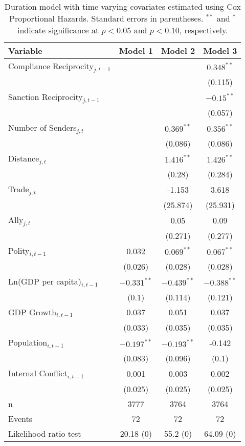 \begin{table}[ht]
\centering
{\normalsize
\begin{tabular}{lccc}
 Variable & Model 1 & Model 2 & Model 3 \\ 
  \hline
\hline
Compliance Reciprocity$_{j,t-1}$ &  &  & $0.348^{\ast\ast}$ \\ 
   &  &  & (0.115) \\ 
  Sanction Reciprocity$_{j,t-1}$ &  &  & $-0.15^{\ast\ast}$ \\ 
   &  &  & (0.057) \\ 
   \hline
Number of Senders$_{j,t}$ &  & $0.369^{\ast\ast}$ & $0.356^{\ast\ast}$ \\ 
   &  & (0.086) & (0.086) \\ 
  Distance$_{j,t}$ &  & $1.416^{\ast\ast}$ & $1.426^{\ast\ast}$ \\ 
   &  & (0.28) & (0.284) \\ 
  Trade$_{j,t}$ &  & -1.153 & 3.618 \\ 
   &  & (25.874) & (25.931) \\ 
  Ally$_{j,t}$ &  & 0.05 & 0.09 \\ 
   &  & (0.271) & (0.277) \\ 
   \hline
Polity$_{i,t-1}$ & 0.032 & $0.069^{\ast\ast}$ & $0.067^{\ast\ast}$ \\ 
   & (0.026) & (0.028) & (0.028) \\ 
  Ln(GDP per capita)$_{i,t-1}$ & $-0.331^{\ast\ast}$ & $-0.439^{\ast\ast}$ & $-0.388^{\ast\ast}$ \\ 
   & (0.1) & (0.114) & (0.121) \\ 
  GDP Growth$_{i,t-1}$ & 0.037 & 0.051 & 0.037 \\ 
   & (0.033) & (0.035) & (0.035) \\ 
  Population$_{i,t-1}$ & $-0.197^{\ast\ast}$ & $-0.193^{\ast\ast}$ & -0.142 \\ 
   & (0.083) & (0.096) & (0.1) \\ 
  Internal Conflict$_{i,t-1}$ & 0.001 & 0.003 & 0.002 \\ 
   & (0.025) & (0.025) & (0.025) \\ 
   \hline
n & 3777 & 3764 & 3764 \\ 
  Events & 72 & 72 & 72 \\ 
  Likelihood ratio test & 20.18 (0) & 55.2 (0) & 64.09 (0) \\ 
   \hline
\hline
\end{tabular}
}
\caption{Duration model with time varying covariates estimated using Cox Proportional Hazards. Standard errors in parentheses. $^{**}$ and $^{*}$ indicate significance at $p< 0.05 $ and $p< 0.10 $, respectively.} 
\label{tab:regResults}
\end{table}
